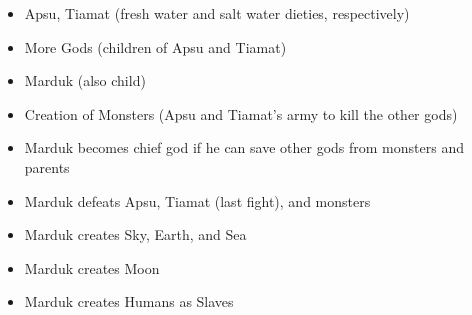 \documentclass{article}
\begin{document}
    \begin{itemize}
        \item Apsu, Tiamat (fresh water and salt water dieties, respectively)
        \item More Gods (children of Apsu and Tiamat)
        \item Marduk (also child)
        \item Creation of Monsters (Apsu and Tiamat's army to kill the other gods)
        \item Marduk becomes chief god if he can save other gods from monsters and parents
        \item Marduk defeats Apsu, Tiamat (last fight), and monsters
        \item Marduk creates Sky, Earth, and Sea
        \item Marduk creates Moon
        \item Marduk creates Humans as Slaves
    \end{itemize}
\end{document}
